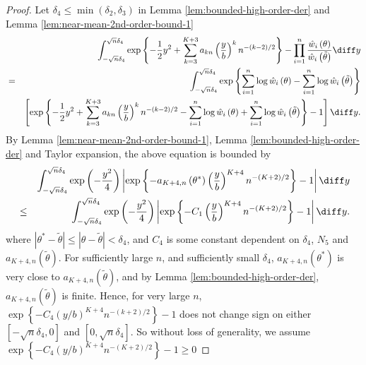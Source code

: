 \begin{proof}
Let $\delta_{4}\le\min\left(\delta_{2},\delta_{3}\right)$ in Lemma
\ref{lem:bounded-high-order-der} and Lemma \ref{lem:near-mean-2nd-order-bound-1}
\begin{eqnarray*}
 &  & \int_{-\sqrt{n}\delta_{4}}^{\sqrt{n}\delta_{4}}\exp\left\{ -\frac{1}{2}y^{2}+\sum_{k=3}^{K+3}a_{kn}\left(\frac{y}{b}\right)^{k}n^{-\left(k-2\right)/2}\right\} -\prod_{i=1}^{n}\frac{\hat{w}_{i}\left(\theta\right)}{\hat{w}_{i}\left(\tilde{\theta}\right)}\diff y\\
 & = & \int_{-\sqrt{n}\delta_{4}}^{\sqrt{n}\delta_{4}}\exp\left\{ \sum_{i=1}^{n}\log\hat{w}_{i}\left(\theta\right)-\sum_{i=1}^{n}\log\hat{w}_{i}\left(\tilde{\theta}\right)\right\} \\
 &  & \left[\exp\left\{ -\frac{1}{2}y^2+\sum_{k=3}^{K+3}a_{kn}\left(\frac{y}{b}\right)^{k}n^{-\left(k-2\right)/2}-\sum_{i=1}^{n}\log\hat{w}_{i}\left(\theta\right)+\sum_{i=1}^{n}\log\hat{w}_{i}\left(\tilde{\theta}\right)\right\} -1\right]\diff y.
\end{eqnarray*}
By %
Lemma \ref{lem:near-mean-2nd-order-bound-1}, %
Lemma \ref{lem:bounded-high-order-der} and Taylor expansion, the
above equation is bounded by 
\begin{eqnarray}
 &  & \int_{-\sqrt{n}\delta_{4}}^{\sqrt{n}\delta_{4}}\exp\left(-\frac{y^{2}}{4}\right)\left|\exp\left\{ -a_{K+4,n}\left(\theta^{*}\right)\left(\frac{y}{b}\right)^{K+4}n^{-\left(K+2\right)/2}\right\} -1\right|\diff y\nonumber \\
 & \le & \int_{-\sqrt{n}\delta_{4}}^{\sqrt{n}\delta_{4}}\exp\left(-\frac{y^{2}}{4}\right)\left|\exp\left\{ -C_{1}\left(\frac{y}{b}\right)^{K+4}n^{-\left(K+2\right)/2}\right\} -1\right|\diff y.\label{eq:bounded-central-int-likratio}
\end{eqnarray}
where $\left|\theta^{*}-\tilde{\theta}\right|\le\left|\theta-\tilde{\theta}\right|<\delta_{4}$,
and $C_{4}$ is some constant dependent on $\delta_{4}$, $N_{5}$
and $a_{K+4,n}\left(\tilde{\theta}\right)$. For sufficiently large
$n$, and sufficiently small $\delta_{4}$, $a_{K+4,n}\left(\theta^{*}\right)$
is very close to $a_{K+4,n}\left(\tilde{\theta}\right)$, and by %
Lemma \ref{lem:bounded-high-order-der}, $a_{K+4,n}\left(\tilde{\theta}\right)$
is finite. Hence, for very large $n$,  $\exp\left\{ -C_{4}\left(y/b\right)^{K+4}n^{-\left(k+2\right)/2}\right\} -1$
does not change sign on either $\left[-\sqrt{n}\delta_{4},0\right]$
and $\left[0,\sqrt{n}\delta_{4}\right]$. So without loss of generality,
we assume $\exp\left\{ -C_{4}\left(y/b\right)^{K+4}n^{-\left(K+2\right)/2}\right\} -1\ge0$

\end{proof}
